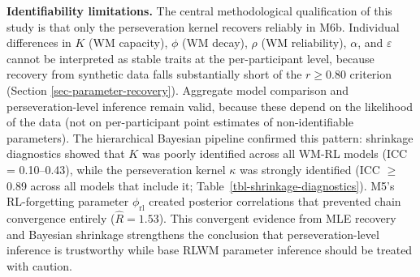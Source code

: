 \documentclass{article}
\begin{document}
\textbf{Identifiability limitations.} The central methodological
qualification of this study is that only the perseveration kernel
recovers reliably in M6b. Individual differences in \(K\) (WM capacity),
\(\phi\) (WM decay), \(\rho\) (WM reliability), \(\alpha\), and
\(\varepsilon\) cannot be interpreted as stable traits at the
per-participant level, because recovery from synthetic data falls
substantially short of the \(r \geq 0.80\) criterion (Section
\ref{sec-parameter-recovery}). Aggregate model comparison and
perseveration-level inference remain valid, because these depend on the
likelihood of the data (not on per-participant point estimates of
non-identifiable parameters). The hierarchical Bayesian pipeline
confirmed this pattern: shrinkage diagnostics showed that \(K\) was
poorly identified across all WM-RL models (ICC = 0.10--0.43), while the
perseveration kernel \(\kappa\) was strongly identified (ICC \(\geq\)
0.89 across all models that include it;
Table~\ref{tbl-shrinkage-diagnostics}). M5's RL-forgetting parameter
\(\phi_{\text{rl}}\) created posterior correlations that prevented chain
convergence entirely (\(\hat{R} = 1.53\)). This convergent evidence from
MLE recovery and Bayesian shrinkage strengthens the conclusion that
perseveration-level inference is trustworthy while base RLWM parameter
inference should be treated with caution.
\end{document}
